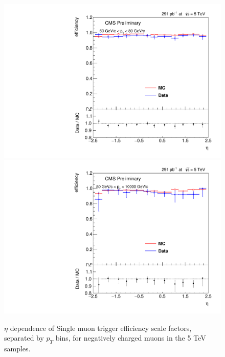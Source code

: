 \begin{figure}
\includegraphics[width=0.48\linewidth]{plots/efficiency/5_zmmhlt_negative/PtBins_eta_pt10.pdf}
\includegraphics[width=0.48\linewidth]{plots/efficiency/5_zmmhlt_negative/PtBins_eta_pt11.pdf}
\caption{$\eta$ dependence of Single muon trigger efficiency scale factors, separated by $p_T$ bins, for negatively charged muons in the 5 TeV samples.}
\label{fig:Eff:mu:5:HLT:neg}
\end{figure}
